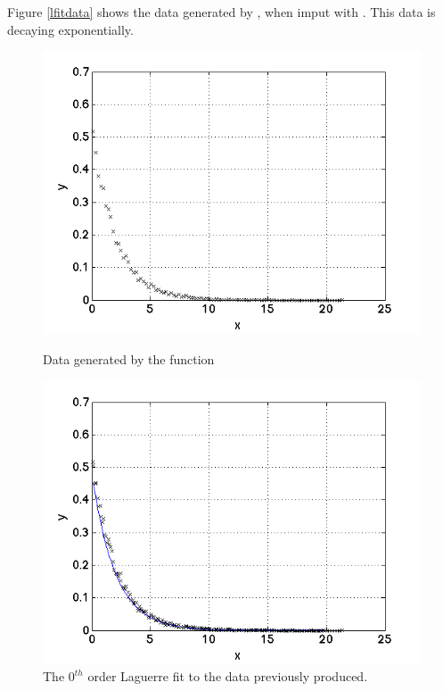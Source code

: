 \documentclass{article}
\begin{document}

Figure \ref{lfitdata} shows the data generated by , when imput with . This data is decaying exponentially. %

\begin{figure}[h]
\centering
	\begin{minipage}[c][][b]{0.45\linewidth}
		\begin{center}
		\includegraphics[scale=0.35]{Matlab/FittingData/Graph/lfitdata.png}  
		\end{center}
		\caption[b]{Data generated by the  function}
		\label{lfitdata}
	\end{minipage}
\quad\quad\quad\quad
	\begin{minipage}[c][][b]{0.45\linewidth}
		\begin{center}
		\includegraphics[scale=0.35]{Matlab/FittingData/Graph/Lfitn0.png}
		\end{center}
		\caption[b]{The $0^{th}$ order Laguerre fit to the data previously produced.}
		\label{lfit0}
	\end{minipage}

\end{figure}
\end{document}
